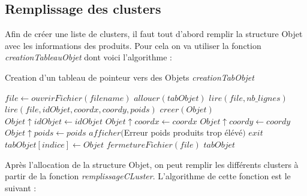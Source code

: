 \documentclass[twoside,UTF8]{EPURapport}
\begin{document}
\subsection{Remplissage des clusters}

Afin de créer une liste de clusters, il faut tout d'abord remplir la structure Objet avec les informations des produits. Pour cela on va utiliser la fonction \textit{creationTableauObjet} dont voici l'algorithme : 

\begin{algorithm}[H]
\caption{Creation d'un tableau de pointeur vers des Objets \textit{creationTabObjet}}
\label{algo:creationTabObjet}
\begin{algorithmic}[1]

\STATE $file \leftarrow ouvrirFichier(filename)$ 
\STATE $allouer(tabObjet)$
\STATE $lire(file, nb\_lignes)$
	\STATE $lire(file, idObjet, coordx, coordy, poids)$
	\STATE $creer(Objet)$
	\STATE $Objet\uparrow idObjet \leftarrow idObjet$
	\STATE $Objet\uparrow coordx \leftarrow coordx$
	\STATE $Objet\uparrow coordy \leftarrow coordy$
	\STATE $Objet\uparrow poids \leftarrow poids$
	\STATE $afficher($Erreur poids produits trop élévé$)$
	\STATE $exit$
	\ENDIF
	\STATE $tabObjet[indice] \leftarrow Objet$
\ENDFOR
\STATE $fermetureFichier(file)$
\RETURN $tabObjet$

\end{algorithmic}
\end{algorithm}

Après l'allocation de la structure Objet, on peut remplir les différents clusters à partir de la fonction \textit{remplissageCLuster}. L'algorithme de cette fonction est le suivant : 
\end{document}
